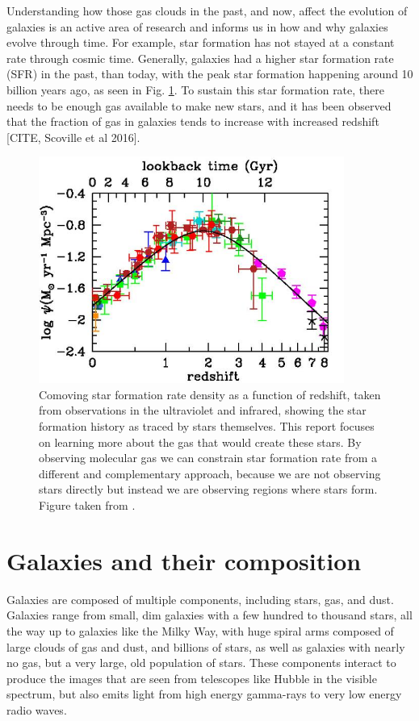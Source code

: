 \documentclass[twoside,single]{lion-msc}
\begin{document}
Understanding how those gas clouds in the past, and now, affect the evolution of galaxies is an active area of research and informs us in how and why galaxies evolve through time. For example, star formation has not stayed at a constant rate through cosmic time. Generally, galaxies had a higher star formation rate (SFR) in the past, than today, with the peak star formation happening around 10 billion years ago, as seen in Fig. \ref{fig:SFR_History}. To sustain this star formation rate, there needs to be enough gas available to make new stars, and it has been observed that the fraction of gas in galaxies tends to increase with increased redshift [CITE, Scoville et al 2016]. 

\begin{figure}[tbp]
\centering \includegraphics[width=100mm]{results_text/figure9a.jpg}
\caption{Comoving star formation rate density as a function of redshift, taken from observations in the ultraviolet and infrared, showing the  star formation history as traced by stars themselves. This report focuses on learning more about the gas that would create these stars. By observing molecular gas we can constrain star formation rate from a different and complementary approach, because we are not observing stars directly but instead we are observing regions where stars form. Figure taken from \cite{madau2014cosmic}.}
\label{fig:SFR_History}
\end{figure}

\section{Galaxies and their composition}

Galaxies are composed of multiple components, including stars, gas, and dust. Galaxies range from small, dim galaxies with a few hundred to thousand stars, all the way up to galaxies like the Milky Way, with huge spiral arms composed of large clouds of gas and dust, and billions of stars, as well as galaxies with nearly no gas, but a very large, old population of stars. These components interact to produce the images that are seen from telescopes like Hubble in the visible spectrum, but also emits light from high energy gamma-rays to very low energy radio waves. 
\end{document}
